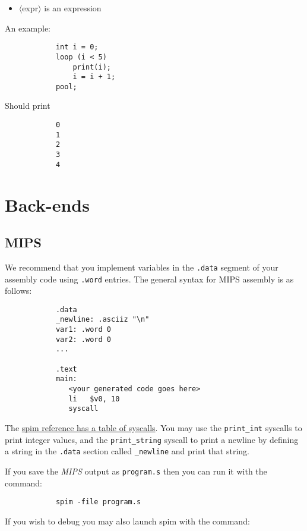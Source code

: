 \documentclass{article}
\newcommand{\code}[1]{\texttt{\textmd{#1}}}
\begin{document}
		\begin{itemize}
			\item{$\langle$expr$\rangle$} is an expression
		\end{itemize}

		An example:

		\begin{lstlisting}
			int i = 0;
			loop (i < 5)
				print(i);
				i = i + 1;
			pool;
		\end{lstlisting}

		Should print

		\begin{lstlisting}
			0
			1
			2
			3
			4
		\end{lstlisting}

\section{Back-ends}

	\subsection{MIPS}

		We recommend that you implement variables in the \code{.data} segment of your assembly code using \code{.word} entries. The
		general syntax for MIPS assembly is as follows:

		\begin{lstlisting}
			.data
			_newline: .asciiz "\n"
			var1: .word 0
			var2: .word 0
			...

			.text
			main:
			   <your generated code goes here>
			   li   $v0, 10
			   syscall
		\end{lstlisting}

		The \href{https://www.cs.tcd.ie/\string~waldroj/itral/spim_ref.html}{spim reference has a table of syscalls}.
		You may use the \texttt{print\_int} syscalls to print integer values, and the \texttt{print\_string} syscall to
		print a newline by defining a string in the \texttt{.data} section called \texttt{\_newline} and print that
		string.

		If you save the \textit{MIPS} output as \code{program.s} then you can run it with the command:

		\begin{lstlisting}
			spim -file program.s
		\end{lstlisting}

		If you wish to debug you may also launch spim with the command:
\end{document}
